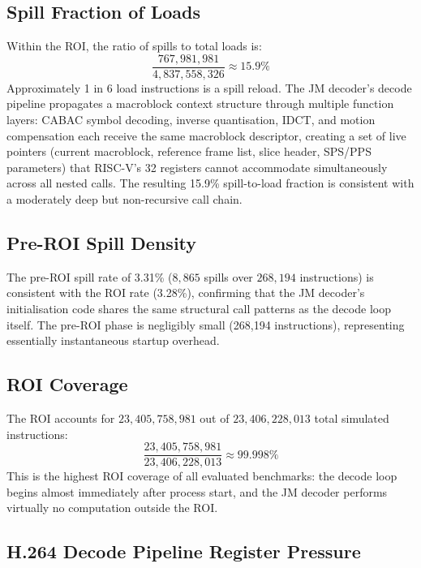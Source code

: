 \documentclass[conference]{IEEEtran}
\begin{document}
\subsection{Spill Fraction of Loads}

Within the ROI, the ratio of spills to total loads is:
\[
\frac{767{,}981{,}981}{4{,}837{,}558{,}326} \approx 15.9\%
\]
Approximately 1 in 6 load instructions is a spill reload. The JM
decoder's decode pipeline propagates a macroblock context structure
through multiple function layers: CABAC symbol decoding, inverse
quantisation, IDCT, and motion compensation each receive the same
macroblock descriptor, creating a set of live pointers (current
macroblock, reference frame list, slice header, SPS/PPS parameters)
that RISC-V's 32 registers cannot accommodate simultaneously across
all nested calls. The resulting 15.9\% spill-to-load fraction is
consistent with a moderately deep but non-recursive call chain.

\subsection{Pre-ROI Spill Density}

The pre-ROI spill rate of 3.31\% ($8{,}865$ spills over $268{,}194$
instructions) is consistent with the ROI rate (3.28\%), confirming
that the JM decoder's initialisation code shares the same structural
call patterns as the decode loop itself. The pre-ROI phase is
negligibly small (268,194 instructions), representing essentially
instantaneous startup overhead.

\subsection{ROI Coverage}

The ROI accounts for $23{,}405{,}758{,}981$ out of $23{,}406{,}228{,}013$
total simulated instructions:
\[
\frac{23{,}405{,}758{,}981}{23{,}406{,}228{,}013} \approx 99.998\%
\]
This is the highest ROI coverage of all evaluated benchmarks: the
decode loop begins almost immediately after process start, and the
JM decoder performs virtually no computation outside the ROI.

\subsection{H.264 Decode Pipeline Register Pressure}
\end{document}
